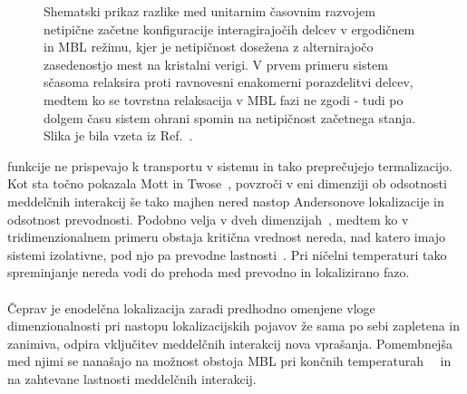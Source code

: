\documentclass[10pt,a4paper]{article}
\begin{document}
\begin{minipage}[t]{0.55\textwidth}
\begin{figure}[H]
\caption{
Shematski prikaz razlike med unitarnim časovnim razvojem netipične začetne konfiguracije interagirajočih delcev v ergodičnem in MBL režimu, kjer je netipičnost dosežena z alternirajočo zasedenostjo mest na kristalni verigi.
 V prvem primeru sistem sčasoma relaksira proti ravnovesni enakomerni porazdelitvi delcev, medtem ko se tovrstna relaksacija v MBL fazi ne zgodi - tudi po dolgem času sistem ohrani spomin na netipičnost začetnega stanja. Slika je bila vzeta iz Ref.~\cite{abanin2018ergodicity}. 
}
\label{fig:abanin_thermalization}
\end{figure}
\end{minipage}
funkcije ne
 prispevajo k transportu v sistemu in tako preprečujejo termalizacijo. Kot sta točno pokazala Mott in Twose~\cite{doi:10.1080/00018736100101271}, povzroči v eni dimenziji ob odsotnosti meddelčnih interakcij še tako majhen nered nastop Andersonove lokalizacije in odsotnost prevodnosti. Podobno velja v dveh dimenzijah~\cite{abrahams1979scaling}, medtem ko v tridimenzionalnem primeru obstaja kritična vrednost nereda, nad katero imajo sistemi izolativne, pod njo pa prevodne lastnosti~\cite{mott1990metal}. Pri ničelni temperaturi tako spreminjanje nereda vodi do prehoda med prevodno in lokalizirano fazo. \\\\
 Čeprav je enodelčna lokalizacija zaradi predhodno omenjene  vloge dimenzionalnosti pri nastopu lokalizacijskih pojavov že sama po sebi zapletena in zanimiva, odpira vključitev meddelčnih interakcij nova vprašanja. Pomembnejša med njimi se nanašajo na možnost obstoja MBL pri končnih temperaturah~\cite{basko2006metal}~\cite{PhysRevB.75.155111} in na zahtevane lastnosti meddelčnih interakcij.  
\end{document}
